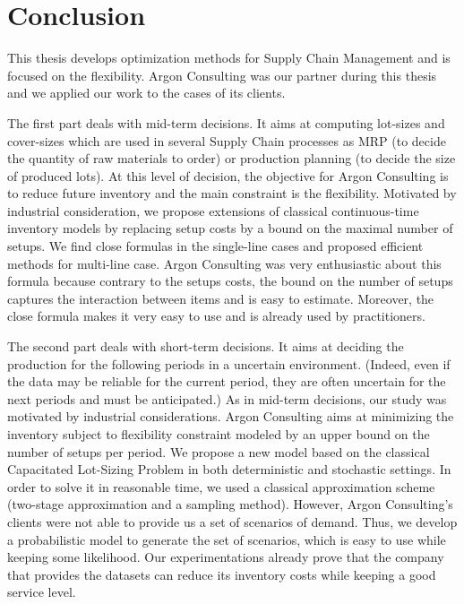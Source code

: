 \chapter*{Conclusion}
\label{chap:conclusion}



This thesis develops optimization methods for Supply Chain Management and is focused on the flexibility.
Argon Consulting was our partner during this thesis and we applied our work to the cases of its clients.


The first part deals with mid-term decisions.
It aims at computing lot-sizes and cover-sizes which are used in several Supply Chain processes as MRP (to decide the quantity of raw materials to order) or production planning (to decide the size of produced lots).
At this level of decision, the objective for Argon Consulting is to reduce future inventory and the main constraint is the flexibility.
Motivated by industrial consideration, we propose extensions of classical continuous-time inventory models by replacing setup costs by a bound on the maximal number of setups.
We find close formulas in the single-line cases and proposed efficient methods for multi-line case.
Argon Consulting was very enthusiastic about this formula because contrary to the setups costs, the bound on the number of setups captures the interaction between items and is easy to estimate.
Moreover, the close formula makes it very easy to use and is already used by practitioners.


The second part deals with short-term decisions.
It aims at deciding the production for the following periods in a uncertain environment.
(Indeed, even if the data may be reliable for the current period, they are often uncertain for the next periods and must be anticipated.)
As in mid-term decisions, our study was motivated by industrial considerations.
Argon Consulting aims at minimizing the inventory subject to flexibility constraint modeled by an upper bound on the number of setups per period.
We propose a new model based on the classical Capacitated Lot-Sizing Problem in both deterministic and stochastic settings.
In order to solve it in reasonable time, we used a classical approximation scheme (two-stage approximation and a sampling method).
However, Argon Consulting's clients were not able to provide us a set of scenarios of demand.
Thus, we develop a probabilistic model to generate the set of scenarios, which is easy to use while keeping some likelihood.
Our experimentations already prove that the company that provides the datasets can reduce its inventory costs while keeping a good service level.



